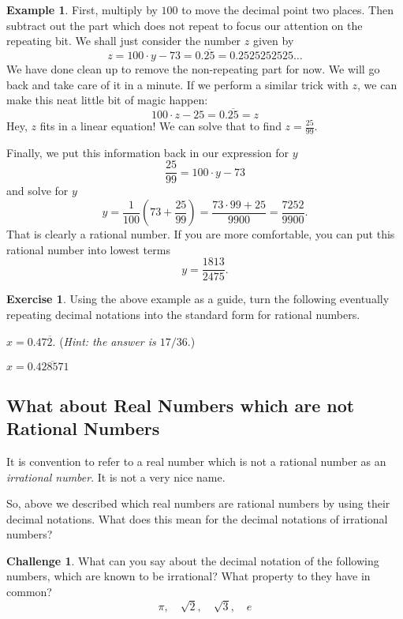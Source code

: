 \documentclass[12pt,letterpaper]{article}
\theoremstyle{definition}
\newtheorem{example}{Example}
\newtheorem{exercise}[question]{Exercise}
\newtheorem*{challenge}{Challenge}
\begin{document}
\begin{example}
First, multiply by $100$ to move the decimal point two places.
Then subtract out the part which does not repeat to focus our attention on the repeating bit.
We shall just consider the number $z$ given by 
\[
z = 100 \cdot y - 73 = 0.\overline{25} = 0.2525252525\ldots
\]
We have done clean up to remove the non-repeating part for now.
We will go back and take care of it in a minute.
If we perform a similar trick with $z$, we can make this neat little bit of magic happen:
\[
100\cdot z -25 = 0.\overline{25} = z
\]
Hey, $z$ fits in a linear equation!
We can solve that to find $z = \frac{25}{99}$.

Finally, we put this information back in our expression for $y$
\[
\frac{25}{99} = 100 \cdot y -73
\]
and solve for $y$
\[
y = \frac{1}{100} \left( 73 + \frac{25}{99} \right) = \frac{73 \cdot 99 + 25}{9900} = \frac{7252}{9900} .
\]
That is clearly a rational number.
If you are more comfortable, you can put this rational number into lowest terms 
\[
y = \frac{1813}{2475}.
\]
\end{example}

\begin{exercise}
Using the above example as a guide, turn the following eventually repeating decimal notations into the standard form for rational numbers.
\begin{compactitem}
\item $x = 0.47\overline{2}$.  \hspace{.5in} (\emph{Hint: the answer is $17/36$}.)
\item $x = 0.\overline{428571}$
\end{compactitem}
\end{exercise}


\subsection*{What about Real Numbers which are not Rational Numbers}

It is convention to refer to a real number which is not a rational number as an \emph{irrational number}. 
It is not a very nice name.

So, above we described which real numbers are rational numbers by using their decimal notations.
What does this mean for the decimal notations of irrational numbers?

\begin{challenge}
What can you say about the decimal notation of the following numbers, which are known to be irrational?
What property to they have in common?
\[
\pi, \quad \sqrt{2}, \quad \sqrt{3}, \quad e
\]
\end{challenge}
\end{document}
